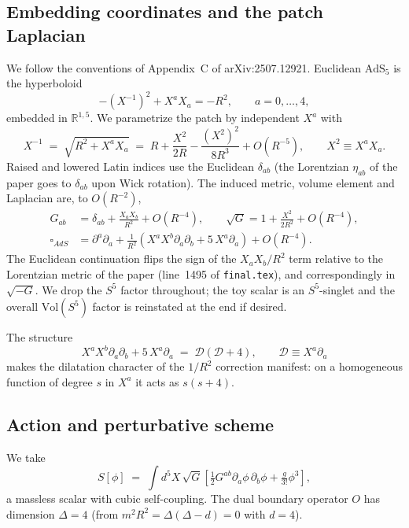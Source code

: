 \documentclass[11pt]{article}
\newcommand{\AdSf}{\mathrm{AdS}_5}
\newcommand{\bdy}{\partial}
\renewcommand{\Box}{\square}
\begin{document}
\subsection{Embedding coordinates and the patch Laplacian}

We follow the conventions of Appendix~C of arXiv:2507.12921. Euclidean $\AdSf$ is the hyperboloid
\begin{equation}
    -(X^{-1})^2 + X^a X_a = -R^2,\qquad a=0,\ldots,4,
\end{equation}
embedded in $\mathbb{R}^{1,5}$. We parametrize the patch by independent $X^a$ with
\begin{equation}
    X^{-1} \;=\; \sqrt{R^2 + X^a X_a} \;=\; R + \frac{X^2}{2R} - \frac{(X^2)^2}{8R^3} + O(R^{-5}),\qquad X^2 \equiv X^a X_a.
\end{equation}
Raised and lowered Latin indices use the Euclidean $\delta_{ab}$ (the Lorentzian $\eta_{ab}$ of the paper goes to $\delta_{ab}$ upon Wick rotation). The induced metric, volume element and Laplacian are, to $O(R^{-2})$,
\begin{align}
    G_{ab} &= \delta_{ab} + \frac{X_a X_b}{R^2} + O(R^{-4}),\qquad
    \sqrt{G} = 1 + \frac{X^2}{2R^2} + O(R^{-4}),\\
    \Box_{AdS} &= \bdy^a\bdy_a + \frac{1}{R^2}\!\left(X^a X^b\bdy_a\bdy_b + 5\,X^a\bdy_a\right) + O(R^{-4}).
    \label{eq:box}
\end{align}
The Euclidean continuation flips the sign of the $X_aX_b/R^2$ term relative to the Lorentzian metric of the paper (line~1495 of \texttt{final.tex}), and correspondingly in $\sqrt{-G}$. We drop the $S^5$ factor throughout; the toy scalar is an $S^5$-singlet and the overall $\mathrm{Vol}(S^5)$ factor is reinstated at the end if desired.

The structure
\begin{equation}
    X^a X^b\bdy_a\bdy_b + 5\,X^a\bdy_a \;=\; \mathcal{D}(\mathcal{D}+4),\qquad \mathcal{D}\equiv X^a\bdy_a
    \label{eq:Dfactor}
\end{equation}
makes the dilatation character of the $1/R^2$ correction manifest: on a homogeneous function of degree $s$ in $X^a$ it acts as $s(s+4)$.

\subsection{Action and perturbative scheme}

We take
\begin{equation}
    S[\phi] \;=\; \int\! d^5X\,\sqrt{G}\left[\tfrac12 G^{ab}\bdy_a\phi\,\bdy_b\phi + \tfrac{g}{3!}\phi^3\right],
    \label{eq:action}
\end{equation}
a massless scalar with cubic self-coupling. The dual boundary operator $O$ has dimension $\Delta=4$ (from $m^2 R^2 = \Delta(\Delta-d) = 0$ with $d=4$).
\end{document}
